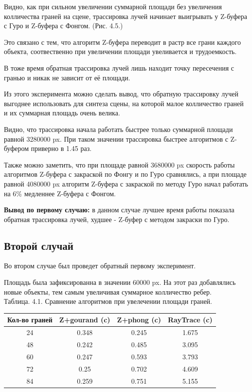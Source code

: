 \documentclass[12pt]{report}
\begin{document}
	Видно, как при сильном увеличении суммарной площади без увеличения колличества граней на сцене, трассировка лучей начинает выигрывать у Z-буфера с Гуро и Z-буфера с Фонгом. (Рис. 4.5.)
	
	Это связано с тем, что алгоритм Z-буфера переводит в растр все грани каждого объекта, соотвественно при увеличении площади увеливается и трудоемкость.
	
	В тоже время обратная трассировка лучей лишь находит точку пересечения с гранью и никак не зависит от её площади.
	
	Из этого эксперимента можно сделать вывод, что обратную трассировку лучей выгоднее использовать для синтеза сцены, на которой малое колличество граней и их суммарная площадь очень велика.
	
	Видно, что трассировка начала работать быстрее только суммарной площади равной 3280000 px. При таком значении трассировка быстрее алгоритмов с Z-буфером приверно в 1.45 раз.
	
	Также можно заметить, что при площаде равной 3680000 px скорость работы алгоритмов Z-буфера с закраской по Фонгу и по Гуро сравнялись, а при площаде равной 4080000 px алгоритм Z-буфера с закраской по методу Гуро начал работать на 6\% медленнее Z-буфера с Фонгом.
	
	\textbf{Вывод по первому случаю:} в данном случае лучшее время работы показала обратная трассировка лучей, худшее - Z-буфер с методом закраски по Гуро.
	
	\subsection{Второй случай}
	
	Во втором случае был проведет обратный первому эксперимент. 
	
	Площадь была зафиксированна в значении 60000 px. На этот раз добавлялись новые объекты, тем самым увеличивая суммарное колличество ребер.
	~\\
	
		Таблица. 4.1. Сравнение алгоритмов при увелечении площади граней.
	
	\begin{center}
		\begin{tabular}{|c c c c|}
			\hline
			Кол-во граней & Z+gourand (c) & Z+phong (c) & RayTrace (c) \\ [0.5ex]
			\hline
			24 & 0.348 & 0.245 & 1.675 \\ 
			\hline 
			48 & 0.242 & 0.485 & 3.095 \\ 
			\hline 
			60 & 0.247 & 0.593 & 3.793 \\ 
			\hline 
			72 & 0.25 & 0.702 & 4.609 \\ 
			\hline 
			84 & 0.259 & 0.751 & 5.155 \\ 
			\hline
		\end{tabular}
	\end{center}
	~\\
\end{document}
